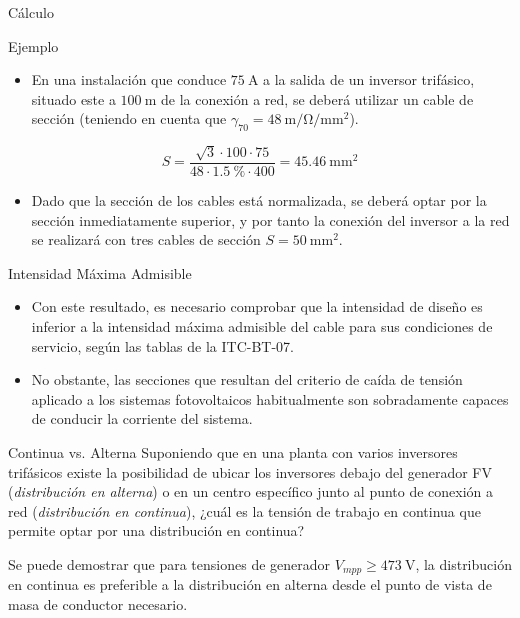 \documentclass[aspectratio=169, usenames,svgnames,dvipsnames]{beamer}
\begin{document}
\begin{frame}[label={sec:org9eb0789}]{Cálculo}
\begin{block}{Ejemplo}
\begin{itemize}
\item En una instalación que conduce \(\SI{75}{\ampere}\) a la salida de un
inversor trifásico, situado este a \(\SI{100}{\meter}\) de la conexión
a red, se deberá utilizar un cable de sección (teniendo en cuenta
que \(\gamma_{70} = \SI{48}{\meter\per\ohm\per\milli\meter\squared}\)).
\end{itemize}


\[
  S=\frac{\sqrt{3} \cdot 100 \cdot 75}{48 \cdot \SI{1.5}{\percent}\cdot400}=\SI{45.46}{\milli\meter\squared}
\]

\begin{itemize}
\item Dado que la sección de los cables está normalizada, se deberá optar
por la sección inmediatamente superior, y por tanto la conexión del
inversor a la red se realizará con tres cables de sección
\(S=\SI{50}{\milli\meter\squared}\).
\end{itemize}
\end{block}
\end{frame}

\begin{frame}[label={sec:org86bbdb9}]{Intensidad Máxima Admisible}
\begin{itemize}
\item Con este resultado, es necesario comprobar que la intensidad de diseño es inferior a la intensidad máxima admisible del cable para sus condiciones de servicio, según las tablas de la ITC-BT-07.

\item No obstante, las secciones que resultan del criterio de caída de tensión aplicado a los sistemas fotovoltaicos habitualmente son sobradamente capaces de conducir la corriente del sistema.
\end{itemize}
\end{frame}

\begin{frame}[label={sec:org9b89c5b}]{Continua vs. Alterna}
Suponiendo que en una planta con varios inversores trifásicos existe la
posibilidad de ubicar los inversores debajo del generador FV
(\emph{distribución en alterna}) o en un centro específico junto al punto de
conexión a red (\emph{distribución en continua}), \alert{¿cuál es la tensión de
trabajo en continua que permite optar por una distribución en continua?}

Se puede demostrar que para tensiones de generador \(V_{mpp} \geq
\qty{473}{\volt}\), la distribución en continua es preferible a la
distribución en alterna desde el punto de vista de masa de conductor
necesario.
\end{frame}
\end{document}
